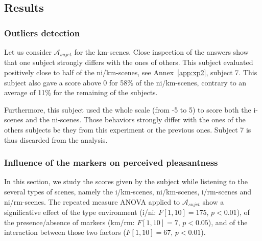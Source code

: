 \documentclass[twoside,twocolumn]{article}
\begin{document}
\subsection{Results}

\subsubsection{Outliers detection}


Let us consider $\mathcal{A}_{sujet}$ for the km-scenes. Close inspection of the answers show that one subject strongly differs with the ones of others. This subject evaluated positively close to half of the ni/km-scenes, see Annex~\ref{app:xp2}, subject 7. This subject also gave a score above 0 for 58\% of the ni/km-scenes, contrary to an average of 11\% for the remaining of the subjects.

Furthermore, this subject used the whole scale (from -5 to 5) to score both the i-scenes and the ni-scenes. Those behaviors strongly differ with the ones of the others subjects be they from this experiment or the previous ones. Subject 7 is thus discarded from the analysis.

\subsubsection{Influence of the markers on perceived pleasantness}


In this section, we study the scores given by the subject while listening to the several types of scenes, namely the i/km-scenes, ni/km-scenes, i/rm-scenes and ni/rm-scenes. The repeated measure ANOVA applied to $\mathcal{A}_{sujet}$ show a significative effect of the type environment (i/ni: $F[1,10]=175$, $p<0.01$), of the presence/absence of markers (km/rm: $F[1,10]=7$, $p<0.05$), and of the interaction between those two factors ($F[1,10]=67$, $p<0.01$).
\end{document}
